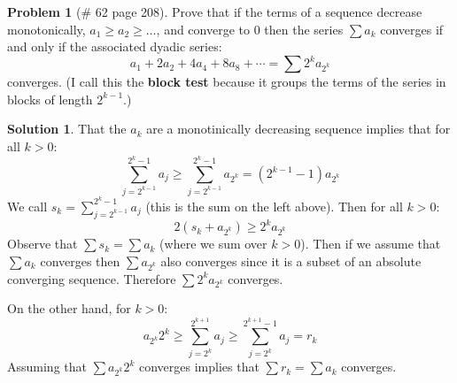 \documentclass{article}
\theoremstyle{definition}
\newtheorem*{soln}{Solution}
\newtheorem*{prob}{Problem}
\theoremstyle{theorem}
\begin{document}
\begin{prob}[\# 62  page 208]
    Prove that if the terms of a sequence decrease monotonically, $a_1 \geq a_2\geq \ldots$, and converge to 0 then the series $\sum a_k$ converges if and only if the associated dyadic series:
    $$a_1 + 2a_2 +4a_4 +8a_8 + \cdots = \sum 2^k a_{2^k }$$
    converges. (I call this the \textbf{block test} because it groups the terms of the series in blocks of length $2^{k-1 }$.)
\end{prob}
\begin{soln}
    That the $a_k$ are a monotinically decreasing sequence implies that for all $k>0$:
    $$ \sum_{j= 2^{k-1 }}^{2^k-1 }a_j \geq \sum_{j=2^{k-1 } }^{2^k-1 }a_{2^k } = (2^{k-1 }-1)a_{2^k }$$
    We call $s_k=\sum_{j= 2^{k-1 }}^{2^k-1 }a_j$ (this is the sum on the left above). Then for all $k>0$:
    $$2(s_k + a_{2^k }) \geq 2^ka_{2^k }$$
    Observe that $\sum s_k = \sum a_k$ (where we sum over $k>0$). Then if we assume that $\sum a_k$ converges then $\sum a_{2^k }$ also converges since it is a subset of an absolute converging sequence. Therefore  $\sum 2^k a_{2^k }$ converges.

    On the other hand, for $k >0$:
    $$a_{2^k }2^k \geq \sum_{j=2^k }^{2^{k+1 } }a_j \geq \sum_{j=2^k }^{2^{k+1 }-1 }a_j = r_k $$
    Assuming that $\sum a_{2^k }2^k $ converges implies that $\sum r_k = \sum a_k$ converges.
\end{soln}
\vspace{1in}
\end{document}
